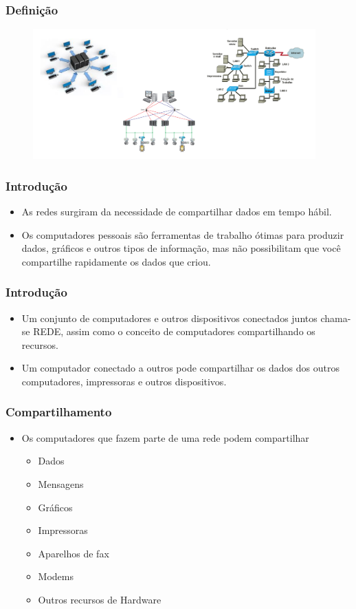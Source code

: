 \documentclass[aspectratio=169,
				xcolor=table]{beamer}
\begin{document}
	\begin{frame}
		\frametitle{Definição}
		\begin{figure}
			\includegraphics[height=5cm, keepaspectratio]{../figs/cap01/redes03.png} 
		\end{figure}
	\end{frame}		
	
	\begin{frame}
		\frametitle{Introdução}
		\begin{itemize}
			\item As redes surgiram da necessidade de compartilhar dados em tempo hábil.
			\item Os computadores pessoais são ferramentas de trabalho ótimas para produzir dados, gráficos e outros tipos de informação, mas não possibilitam que você compartilhe rapidamente os dados que criou.

		\end{itemize}
	\end{frame}	
		
	\begin{frame}
		\frametitle{Introdução}
		\begin{itemize}
			\item Um conjunto de computadores e outros dispositivos conectados juntos chama-se REDE, assim como o conceito de computadores compartilhando os recursos.
			\item Um computador conectado a outros pode compartilhar os dados dos outros computadores, impressoras e outros dispositivos.
		
		\end{itemize}
	\end{frame}
	
	\begin{frame}
		\frametitle{Compartilhamento}
		\begin{itemize}
			\item Os computadores que fazem parte de uma rede podem compartilhar
			\begin{itemize}
				\item Dados
				\item Mensagens
				\item Gráficos
				\item Impressoras
				\item Aparelhos de fax
				\item Modems
				\item Outros recursos de Hardware
			\end{itemize}
		\end{itemize}
	\end{frame}
	
\end{document}
